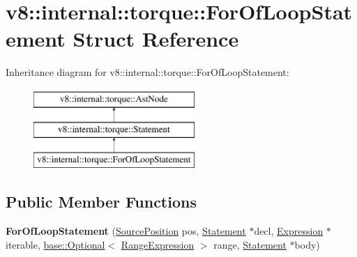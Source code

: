 \hypertarget{structv8_1_1internal_1_1torque_1_1ForOfLoopStatement}{}\section{v8\+:\+:internal\+:\+:torque\+:\+:For\+Of\+Loop\+Statement Struct Reference}
\label{structv8_1_1internal_1_1torque_1_1ForOfLoopStatement}
Inheritance diagram for v8\+:\+:internal\+:\+:torque\+:\+:For\+Of\+Loop\+Statement\+:\begin{figure}[H]
\begin{center}
\leavevmode
\includegraphics[height=3.000000cm]{structv8_1_1internal_1_1torque_1_1ForOfLoopStatement}
\end{center}
\end{figure}
\subsection*{Public Member Functions}
\begin{DoxyCompactItemize}
\item 
\mbox{\label{structv8_1_1internal_1_1torque_1_1ForOfLoopStatement_aa2cb319717578f7a746233b91aebfab6}} 
{\bfseries For\+Of\+Loop\+Statement} (\mbox{\hyperlink{structv8_1_1internal_1_1torque_1_1SourcePosition}{Source\+Position}} pos, \mbox{\hyperlink{structv8_1_1internal_1_1torque_1_1Statement}{Statement}} $\ast$decl, \mbox{\hyperlink{structv8_1_1internal_1_1torque_1_1Expression}{Expression}} $\ast$iterable, \mbox{\hyperlink{classv8_1_1base_1_1Optional}{base\+::\+Optional}}$<$ \mbox{\hyperlink{structv8_1_1internal_1_1torque_1_1RangeExpression}{Range\+Expression}} $>$ range, \mbox{\hyperlink{structv8_1_1internal_1_1torque_1_1Statement}{Statement}} $\ast$body)
\end{DoxyCompactItemize}

